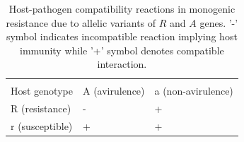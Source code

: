 \documentclass[11pt,dvipsnames,ignorenonframetext,aspectratio=169]{beamer}
\begin{document}
\begin{frame}{}
\protect\hypertarget{section-11}{}
\begin{columns}[T, onlytextwidth]

\begin{table}

\caption{\label{tab:host-path-compatibility-mono}Host-pathogen compatibility reactions in monogenic resistance due to allelic variants of $R$ and $A$ genes. '-' symbol indicates incompatible reaction implying host immunity while '+' symbol denotes compatible interaction.}
\centering
\fontsize{6}{8}\selectfont
\begin{tabular}[t]{>{\raggedright\arraybackslash}p{8em}>{\raggedright\arraybackslash}p{6em}>{\raggedright\arraybackslash}p{6em}}
\toprule
\multicolumn{1}{c}{ } & \multicolumn{2}{c}{Pathogen genotype} \\
\cmidrule(l{3pt}r{3pt}){2-3}
Host genotype & A (avirulence) & a (non-avirulence)\\
\midrule
R (resistance) & - & +\\
r (susceptible) & + & +\\
\bottomrule
\end{tabular}
\end{table}


\begin{table}


\end{table}
\end{columns}
\end{frame}
\end{document}
